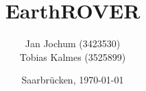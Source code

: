 \begin{titlepage}

	\titlehead
	{
		\texttt{[image: images/logos/HTW]}		
		\hfill
		\texttt{[image: images/logos/mindstorms]}		
	}
	
	\subject
	{
		\Huge Dokumentation\\
		\normalsize Robotik\\
	}
	
	\title
	{
		EarthROVER
	}
	
	\author
	{	
		Jan Jochum (3423530)\\
		Tobias Kalmes (3525899)
	}
	
	\date
	{
		\normalsize{Saarbrücken, \today}
	}	
	\maketitle	
\end{titlepage}
